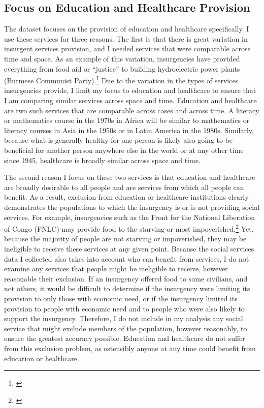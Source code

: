 \documentclass[12pt, letterpaper]{article}
\begin{document}
\subsection*{Focus on Education and Healthcare Provision}
The dataset focuses on the provision of education and healthcare specifically. I use these services for three reasons. The first is that there is great variation in insurgent services provision, and I needed services that were comparable across time and space. As an example of this variation, insurgencies have provided everything from food aid or ``justice'' to building hydroelectric power plants (Burmese Communist Party).\footnote{\citealt[Appendix II]{lintner1990rise}} Due to the variation in the types of services insurgencies provide, I limit my focus to education and healthcare to ensure that I am comparing similar services across space and time. Education and healthcare are two such services that are comparable across cases and across time. A literacy or mathematics course in the 1970s in Africa will be similar to mathematics or literacy courses in Asia in the 1950s or in Latin America in the 1980s. Similarly, because what is generally healthy for one person is likely also going to be beneficial for another person anywhere else in the world or at any other time since 1945, healthcare is broadly similar across space and time. 

The second reason I focus on these two services is that education and healthcare are broadly desirable to all people and are services from which all people can benefit. As a result, exclusion from education or healthcare institutions clearly demonstrates the populations to which the insurgency is or is not providing social services. For example, insurgencies such as the Front for the National Liberation of Congo (FNLC) may provide food to the starving or most impoverished.\footnote{\citealt{moroccan1977, wright1977katanga}} Yet, because the majority of people are not starving or impoverished, they may be ineligible to receive these services at any given point. Because the social services data I collected also takes into account who can benefit from services, I do not examine any services that people might be ineligible to receive, however reasonable their exclusion. If an insurgency offered food to some civilians, and not others, it would be difficult to determine if the insurgency were limiting its provision to only those with economic need, or if the insurgency limited its provision to people with economic need and to people who were also likely to support the insurgency. Therefore, I do not include in my analysis any social service that might exclude members of the population, however reasonably, to ensure the greatest accuracy possible. Education and healthcare do not suffer from this exclusion problem, as ostensibly anyone at any time could benefit from education or healthcare. 
\end{document}
